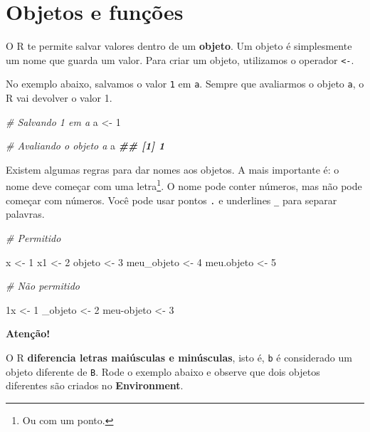 \documentclass[
]{book}
\newenvironment{Shaded}{\begin{snugshade}}{\end{snugshade}}
\newcommand{\CommentTok}[1]{\textcolor[rgb]{0.56,0.35,0.01}{\textit{#1}}}
\newcommand{\DecValTok}[1]{\textcolor[rgb]{0.00,0.00,0.81}{#1}}
\newcommand{\DocumentationTok}[1]{\textcolor[rgb]{0.56,0.35,0.01}{\textbf{\textit{#1}}}}
\newcommand{\NormalTok}[1]{#1}
\newcommand{\OtherTok}[1]{\textcolor[rgb]{0.56,0.35,0.01}{#1}}
\newcommand{\SpecialCharTok}[1]{\textcolor[rgb]{0.00,0.00,0.00}{#1}}
\begin{document}
\hypertarget{objetosFuncoes}{%
\section{Objetos e funções}\label{objetosFuncoes}}

O R te permite salvar valores dentro de um \textbf{objeto}. Um objeto é simplesmente um nome que guarda um valor. Para criar um objeto, utilizamos o operador \texttt{\textless{}-}.

No exemplo abaixo, salvamos o valor \texttt{1} em \texttt{a}. Sempre que avaliarmos o objeto \texttt{a}, o R vai devolver o valor 1.

\begin{Shaded}
\begin{Highlighting}[]
\CommentTok{\# Salvando \textasciigrave{}1\textasciigrave{} em \textasciigrave{}a\textasciigrave{}}
\NormalTok{a }\OtherTok{\textless{}{-}} \DecValTok{1}

\CommentTok{\# Avaliando o objeto \textasciigrave{}a\textasciigrave{}}
\NormalTok{a}
\DocumentationTok{\#\# [1] 1}
\end{Highlighting}
\end{Shaded}

Existem algumas regras para dar nomes aos objetos. A mais importante é: o nome deve começar com uma letra\footnote{Ou com um ponto.}. O nome pode conter números, mas não pode começar com números. Você pode usar pontos \texttt{.} e underlines \texttt{\_} para separar palavras.

\begin{Shaded}
\begin{Highlighting}[]
\CommentTok{\# Permitido}

\NormalTok{x }\OtherTok{\textless{}{-}} \DecValTok{1}
\NormalTok{x1 }\OtherTok{\textless{}{-}} \DecValTok{2}
\NormalTok{objeto }\OtherTok{\textless{}{-}} \DecValTok{3}
\NormalTok{meu\_objeto }\OtherTok{\textless{}{-}} \DecValTok{4}
\NormalTok{meu.objeto }\OtherTok{\textless{}{-}} \DecValTok{5}

\CommentTok{\# Não permitido}

\NormalTok{1x }\OtherTok{\textless{}{-}} \DecValTok{1}
\NormalTok{\_objeto }\OtherTok{\textless{}{-}} \DecValTok{2}
\NormalTok{meu}\SpecialCharTok{{-}}\NormalTok{objeto }\OtherTok{\textless{}{-}} \DecValTok{3}
\end{Highlighting}
\end{Shaded}

\textbf{Atenção!}

O R \textbf{diferencia letras maiúsculas e minúsculas}, isto é, \texttt{b} é considerado um objeto diferente de \texttt{B}. Rode o exemplo abaixo e observe que dois objetos diferentes são criados no \textbf{Environment}.
\end{document}
